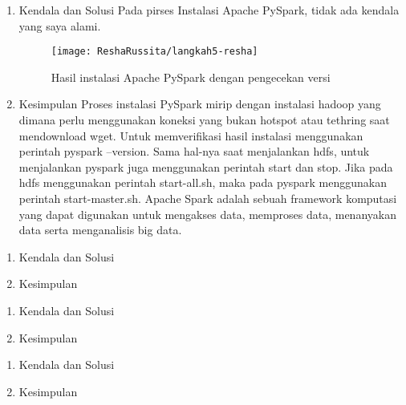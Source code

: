 \begin{enumerate}
\item Kendala dan Solusi
\newline Pada pirses Instalasi Apache PySpark, tidak ada kendala yang saya alami.

\begin{figure}[!ht]
\texttt{[image: ReshaRussita/langkah5-resha]}
\caption{Hasil instalasi Apache PySpark dengan pengecekan versi}
\label{gam:perkuliahan-16-12}
\end{figure}

\item Kesimpulan
\newline Proses instalasi PySpark mirip dengan instalasi hadoop yang dimana perlu menggunakan koneksi yang bukan hotspot atau tethring saat mendownload wget. Untuk memverifikasi hasil instalasi menggunakan perintah pyspark --version. Sama hal-nya saat menjalankan hdfs, untuk menjalankan pyspark juga menggunakan perintah start dan stop. Jika pada hdfs menggunakan perintah start-all.sh, maka pada pyspark menggunakan perintah start-master.sh. Apache Spark adalah sebuah framework komputasi yang dapat digunakan untuk mengakses data, memproses data, menanyakan data serta menganalisis big data. 

\end{enumerate}

\begin{enumerate}
\item Kendala dan Solusi

\item Kesimpulan

\end{enumerate}

\begin{enumerate}
\item Kendala dan Solusi

\item Kesimpulan

\end{enumerate}

\begin{enumerate}
\item Kendala dan Solusi

\item Kesimpulan

\end{enumerate}
